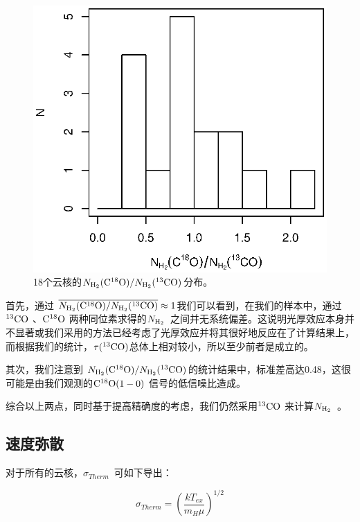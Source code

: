 \documentclass[UTF8, nocolorlinks]{pkuthss}
\newcommand{\cob}{$\rm ^{13}CO$ }
\newcommand{\coc}{$\rm C^{18}O$ }
\newcommand{\cocc}{$\rm C^{18}O(1-0)$ }
\newcommand{\nhyd}{$N_{\rm H_2}$\ }
\newcommand{\sigmath}{$\sigma _{Therm}$\ }
\begin{document}
			\begin{figure}[H]
				\centering
				\includegraphics[totalheight=70mm]{img_plot/1813.eps}
				\caption{\small 18个云核的${N_{\rm H_2}(\rm C^{18}O)}/{ N_{\rm H_2}(\rm ^{13}CO)}$分布。}
				\label{Fig.1813}
			\end{figure}

			首先，通过 $\overline{{N_{\rm H_2}(\rm C^{18}O)}/{N_{\rm H_2}(\rm ^{13}CO)}}\approx 1$我们可以看到，在我们的样本中，通过\cob、\coc 两种同位素求得的\nhyd 之间并无系统偏差。这说明光厚效应本身并不显著或我们采用的方法已经考虑了光厚效应并将其很好地反应在了计算结果上，而根据我们的统计，$\tau(^{13}\rm CO)$总体上相对较小，所以至少前者是成立的。

			其次，我们注意到 ${N_{\rm H_2}(\rm C^{18}O)}/{ N_{\rm H_2}(\rm ^{13}CO)}$的统计结果中，标准差高达0.48，这很可能是由我们观测的\cocc 信号的低信噪比造成。

			综合以上两点，同时基于提高精确度的考虑，我们仍然采用\cob 来计算\nhyd。

		\subsection{速度弥散}

			对于所有的云核，\sigmath 可如下导出：

      		\begin{equation}
      		   \sigma_{Therm}=\left( \frac{kT_{ex}}{m_H \mu} \right)^{1/2}
      		\end{equation}
\end{document}
